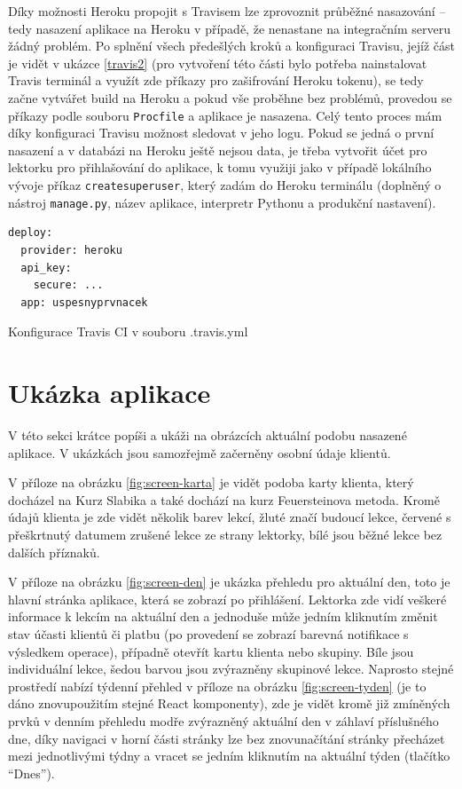     Díky možnosti Heroku propojit s Travisem \cite{travis-heroku} lze zprovoznit průběžné nasazování -- tedy nasazení aplikace na Heroku v případě, že nenastane na integračním serveru žádný problém. Po splnění všech předešlých kroků a konfiguraci Travisu, jejíž část je vidět v ukázce \ref{travis2} (pro vytvoření této části bylo potřeba nainstalovat Travis terminál a využít zde příkazy pro zašifrování Heroku tokenu), se tedy začne vytvářet build na Heroku a pokud vše proběhne bez problémů, provedou se příkazy podle souboru \verb|Procfile| a aplikace je nasazena. Celý tento proces mám díky konfiguraci Travisu možnost sledovat v jeho logu. Pokud se jedná o první nasazení a v databázi na Heroku ještě nejsou data, je třeba vytvořit účet pro lektorku pro přihlašování do aplikace, k tomu využiji jako v případě lokálního vývoje příkaz \verb|createsuperuser|, který zadám do Heroku terminálu (doplněný o nástroj \verb|manage.py|, název aplikace, interpretr Pythonu a produkční nastavení).
    
    \begin{listing}[ht]
    	\begin{verbatim}
deploy:
  provider: heroku
  api_key:
    secure: ...
  app: uspesnyprvnacek
    	\end{verbatim}
    	\caption{Konfigurace Travis CI v souboru .travis.yml}\label{travis2}
    \end{listing}
    
    \section{Ukázka aplikace}
    V této sekci krátce popíši a ukáži na obrázcích aktuální podobu nasazené aplikace. V ukázkách jsou samozřejmě začerněny osobní údaje klientů.
    
    V příloze na obrázku \ref{fig:screen-karta} je vidět podoba karty klienta, který docházel na Kurz Slabika a také dochází na kurz Feuersteinova metoda. Kromě údajů klienta je zde vidět několik barev lekcí, žluté značí budoucí lekce, červené s přeškrtnutý datumem zrušené lekce ze strany lektorky, bílé jsou běžné lekce bez dalších příznaků.
    
    V příloze na obrázku \ref{fig:screen-den} je ukázka přehledu pro aktuální den, toto je hlavní stránka aplikace, která se zobrazí po přihlášení. Lektorka zde vidí veškeré informace k lekcím na aktuální den a jednoduše může jedním kliknutím změnit stav účasti klientů či platbu (po provedení se zobrazí barevná notifikace s výsledkem operace), případně otevřít kartu klienta nebo skupiny. Bíle jsou individuální lekce, šedou barvou jsou zvýrazněny skupinové lekce. Naprosto stejné prostředí nabízí týdenní přehled v příloze na obrázku \ref{fig:screen-tyden} (je to dáno znovupoužitím stejné React komponenty), zde je vidět kromě již zmíněných prvků v denním přehledu modře zvýrazněný aktuální den v záhlaví příslušného dne, díky navigaci v horní části stránky lze bez znovunačítání stránky přecházet mezi jednotlivými týdny a vracet se jedním kliknutím na aktuální týden (tlačítko \enquote{Dnes}).
    

